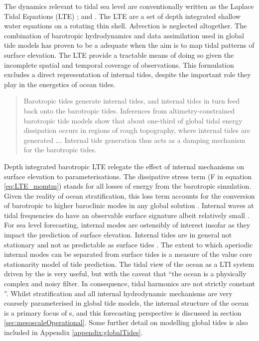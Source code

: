 The dynamics relevant to tidal sea level are conventionally written as the Laplace Tidal Equations (LTE) ; \citep[Sec9.8]{gill1982atmosphere} and \citep{Hendershott:1981ub}.  The LTE are a set of depth integrated shallow water equations on a rotating thin shell.  Advection is neglected altogether.
The combination of barotropic hydrodynamics and data assimilation used in global tide models has proven to be a adequate when the aim is to map tidal patterns of surface elevation.  The LTE provide a tractable means of doing so given the incomplete spatial and temporal coverage of observations.
This formulation excludes a direct representation of internal tides, despite the important role they play in the energetics of ocean tides.
\begin{quote}
    Barotropic tides generate internal tides, and internal tides in turn feed back onto the barotropic tides. Inferences from altimetry-constrained barotropic tide models show that about one-third of global tidal energy dissipation occurs in regions of rough topography, where internal tides are generated \dots{}. Internal tide generation thus acts as a damping mechanism for the barotropic tides.\citep[pp22]{Arbic:hy}
\end{quote}
Depth integrated barotropic LTE relegate the effect of internal mechanisms on surface elevation to parameterisations.  The dissipative stress term (F in equation \ref{eq:LTE_momtm}) stands for all losses of energy from the barotropic simulation.  Given the reality of ocean stratification, this loss term accounts for the conversion of barotropic to higher baroclinic modes in any global solution \citep[pp121] {gill1982atmosphere}.
Internal waves at tidal frequencies do have an observable surface signature albeit relatively small \citep{Ray:2011tj}.  
For sea level forecasting, internal modes are ostensibly of interest insofar as they impact the prediction of surface elevation.  
Internal tides are in general not stationary and not as predictable as surface tides \citep{Nash:2012}.  The extent to which aperiodic internal modes can be separated from surface tides is a measure of the value core stationarity model of  tide prediction.
The tidal view of the ocean as a LTI system driven by the \ATGP{} is very useful, but with the caveat that ``the ocean is a physically complex and noisy filter.  In consequence, tidal harmonics are not strictly constant \citep[197]{Ray:2010jm}''.  
Whilst stratification and all internal hydrodynamic mechanisms are very coarsely parameterised in global tide models, the internal structure of the ocean is a primary focus of \OGCM{}s, and this forecasting perspective is discussed in section \ref{sec:mesoscaleOperational}.  Some further detail on modelling global tides is also included in Appendix \ref{appendix:globalTides}.

